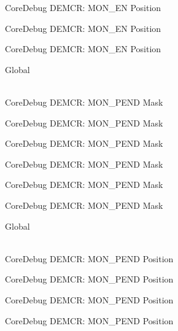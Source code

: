 \begin{DoxyRefList}
\label{deprecated__deprecated000415}%
%
Core\+Debug DEMCR\+: MON\+\_\+\+EN Position 

\label{deprecated__deprecated000504}%
%
Core\+Debug DEMCR\+: MON\+\_\+\+EN Position 

\label{deprecated__deprecated000606}%
%
Core\+Debug DEMCR\+: MON\+\_\+\+EN Position  
\item[{\parbox[t]{\linewidth}{Global \doxylink{group___c_m_s_i_s___core_debug_ga68ec55930269fab78e733dcfa32392f8}{Core\+Debug\+\_\+\+DEMCR\+\_\+\+MON\+\_\+\+PEND\+\_\+\+Msk} }}]\hfill \\
\label{deprecated__deprecated000052}%
%
Core\+Debug DEMCR\+: MON\+\_\+\+PEND Mask 

\label{deprecated__deprecated000196}%
%
Core\+Debug DEMCR\+: MON\+\_\+\+PEND Mask 

\label{deprecated__deprecated000338}%
%
Core\+Debug DEMCR\+: MON\+\_\+\+PEND Mask 

\label{deprecated__deprecated000414}%
%
Core\+Debug DEMCR\+: MON\+\_\+\+PEND Mask 

\label{deprecated__deprecated000503}%
%
Core\+Debug DEMCR\+: MON\+\_\+\+PEND Mask 

\label{deprecated__deprecated000605}%
%
Core\+Debug DEMCR\+: MON\+\_\+\+PEND Mask  
\item[{\parbox[t]{\linewidth}{Global \doxylink{group___c_m_s_i_s___core_debug_ga1e2f706a59e0d8131279af1c7e152f8d}{Core\+Debug\+\_\+\+DEMCR\+\_\+\+MON\+\_\+\+PEND\+\_\+\+Pos} }}]\hfill \\
\label{deprecated__deprecated000051}%
%
Core\+Debug DEMCR\+: MON\+\_\+\+PEND Position 

\label{deprecated__deprecated000195}%
%
Core\+Debug DEMCR\+: MON\+\_\+\+PEND Position 

\label{deprecated__deprecated000337}%
%
Core\+Debug DEMCR\+: MON\+\_\+\+PEND Position 

\label{deprecated__deprecated000413}%
%
Core\+Debug DEMCR\+: MON\+\_\+\+PEND Position 


\end{DoxyRefList}
